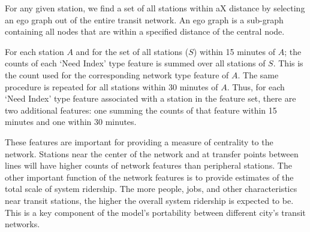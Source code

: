 \documentclass[11pt]{report}
\begin{document}
For any given station, we find a set of all stations within aX distance by selecting an ego graph out of the entire transit network. An ego graph is a sub-graph containing all nodes that are within a specified distance of the central node. 

For each station $A$ and for the set of all stations ($S$) within 15 minutes of $A$; the counts of each `Need Index' type feature is summed over all stations of $S$. This is the count used for the corresponding network type feature of $A$. The same procedure is repeated for all stations within 30 minutes of $A$. Thus, for each `Need Index' type feature associated with a station in the feature set, there are two additional features: one summing the counts of that feature within 15 minutes and one within 30 minutes.

These features are important for providing a measure of centrality to the network. Stations near the center of the network and at transfer points between lines will have higher counts of network features than peripheral stations. The other important function of the network features is to provide estimates of the total scale of system ridership. The more people, jobs, and other characteristics near transit stations, the higher the overall system ridership is expected to be. This is a key component of the model's portability between different city's transit networks. 
\end{document}
